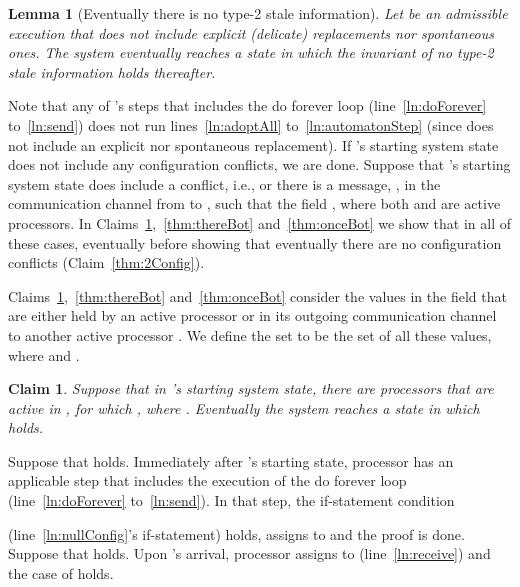 \documentclass[11pt]{article}
\newtheorem{lemma}[theorem]{Lemma}
\newtheorem{claim}[theorem]{Claim}
\newenvironment{proof}{\noindent{\bf Proof.}}{\hfill}
\begin{document}
\begin{lemma}[Eventually there is no type-2 stale information]
\label{thm:noConflict}
Let  be an admissible execution that does not include explicit (delicate) replacements nor spontaneous ones. The system eventually reaches  a state  in which the invariant of no type-2 stale information holds thereafter. 
\end{lemma}
\begin{proof}
Note that any of 's steps that includes the do forever loop (line~\ref{ln:doForever} to~\ref{ln:send}) does not run lines~\ref{ln:adoptAll} to~\ref{ln:automatonStep} (since  does not include an explicit nor spontaneous replacement). If 's starting system state does not include any configuration conflicts, we are done. Suppose that 's starting system state does include a conflict, i.e.,  or there is a message, , in the communication channel from  to , such that the field , where both  and  are active processors. 
In Claims~\ref{thm:thereBotSim},~\ref{thm:thereBot} and~\ref{thm:onceBot} we show that in all of these cases, eventually  before showing that eventually there are no configuration conflicts  (Claim~\ref{thm:2Config}).



Claims~\ref{thm:thereBotSim},~\ref{thm:thereBot} and~\ref{thm:onceBot} consider the values in the field  that are either held by an active processor  or in its outgoing communication channel to another active processor . We define the set  to be the set of all these values, where  and . 





\begin{claim}
\label{thm:thereBotSim}
Suppose that in 's starting system state, there are  processors  that are active in , for which , where . Eventually the system reaches a state in which  holds. 
\end{claim} 


\begin{proof}
Suppose that  holds. Immediately after 's starting state, processor  has an applicable step that includes the execution of the do forever loop (line~\ref{ln:doForever} to~\ref{ln:send}). In that step, the if-statement condition 

(line~\ref{ln:nullConfig}'s if-statement) holds,  assigns  to  and the proof is done. Suppose that  holds. Upon 's arrival, processor  assigns  to  (line~\ref{ln:receive}) and the case of  holds.
\end{proof}




\end{proof}
\end{document}
